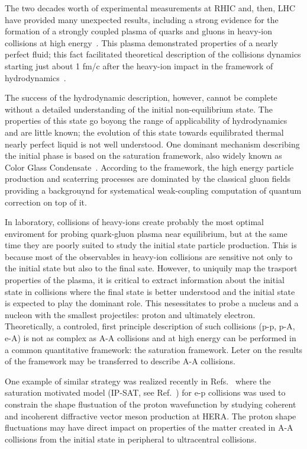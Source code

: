 The two decades worth of experimental
measurements at RHIC and, then, LHC 
have provided many unexpected results, including 
a strong evidence for the formation of 
a strongly coupled plasma of quarks and gluons in
heavy-ion collisions at high energy~\cite{Shuryak:2003xe,Shuryak:2004cy,Adams:2005dq,Song:2010mg}. 
This plasma  
demonstrated properties of a nearly perfect fluid; 
this fact facilitated  theoretical description 
of the collisions dynamics starting just  about 1 fm/c after the heavy-ion impact 
in the framework of hydrodynamics~\cite{Schafer:2009dj,Song:2010mg,Romatschke:2017ejr}.   

The success of the hydrodynamic description, however, cannot be complete 
without a detailed understanding of the initial 
non-equilibrium state. The properties of this state go boyong the range of applicability 
of hydrodynamics and  are little known; 
the evolution of this state towards equilibrated 
thermal nearly perfect liquid  is not well understood. 
One dominant mechanism describing the initial phase is 
based on the saturation framework, also widely known as 
Color Glass Condensate~\cite{Iancu:2002xk,Albacete:2014fwa,KovchegovLevin}. According to the framework, the 
high energy particle production and scaterring processes are 
dominated by the classical gluon fields providing a 
backgrouynd for systematical weak-coupling 
computation of quantum correction on top of it.  

In laboratory, 
collisions of heavy-ions create probably the most optimal enviroment for 
probing quark-gluon plasma near equilibrium, but 
at the same time they are poorly suited to study the 
initial state particle production. This is because 
most of the observables in heavy-ion collisions are 
sensitive not only to the initial state but also 
to the final sate. However, to uniquily map the trasport properties 
of the plasma, it is critical to extract information 
about the initial state in collisions where 
the final state is better understood and the 
initial state is expected to play the dominant role.
This nesessitates to probe a nucleus  and a nucleon with the smallest projectiles: 
proton and ultimately electron. 
Theoretically, a controled,  first principle description of such collisions (p-p, p-A, e-A) 
is not as complex as A-A collisions 
and at high energy can be performed in a common quantitative framework: the saturation framework. 
Leter on the results of the framework may be transferred to describe A-A collisions. 


One example of similar strategy was realized recently in Refs.~\cite{Mantysaari:2016ykx,Mantysaari:2016jaz,Mantysaari:2017cni} 
where the saturation motivated model (IP-SAT, see Ref.~\cite{Kowalski:2003hm}) for e-p collisions  was used to constrain the 
shape flustuation of the proton wavefunction by studying 
coherent and incoherent diffractive 
vector meson production at HERA. The proton shape fluctuations may have direct 
impact on properties of the matter created in A-A collisions from 
the initial state in peripheral to ultracentral collisions. 




